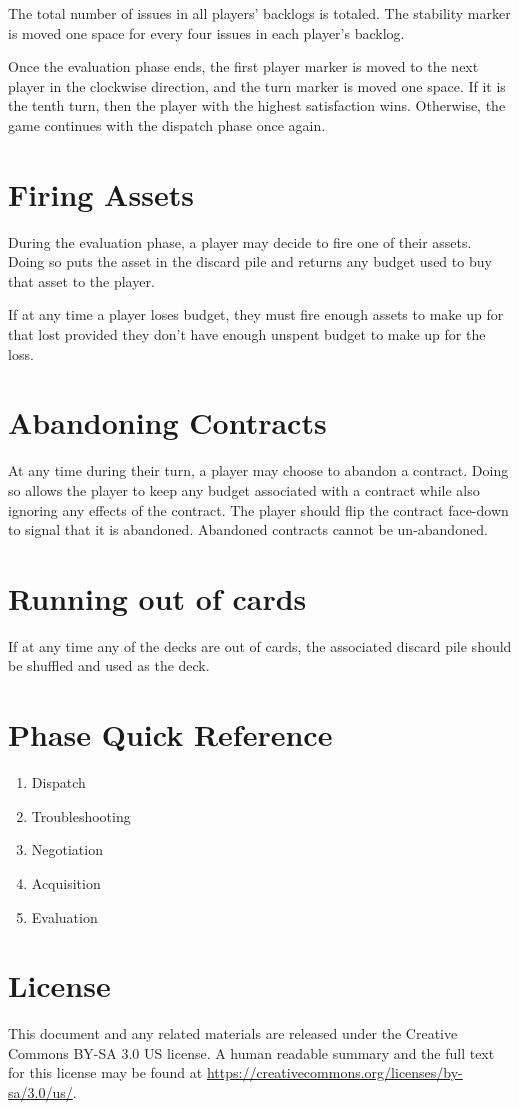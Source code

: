 \documentclass[twocolumn]{article}
\begin{document}
The total number of issues in all players' backlogs is totaled. The stability marker is moved one space for every four issues in each player's backlog.

Once the evaluation phase ends, the first player marker is moved to the next player in the clockwise direction, and the turn marker is moved one space. If it is the tenth turn, then the player with the highest satisfaction wins. Otherwise, the game continues with the dispatch phase once again.

\section*{Firing Assets}

During the evaluation phase, a player may decide to fire one of their assets. Doing so puts the asset in the discard pile and returns any budget used to buy that asset to the player.

If at any time a player loses budget, they must fire enough assets to make up for that lost provided they don't have enough unspent budget to make up for the loss.

\section*{Abandoning Contracts}

At any time during their turn, a player may choose to abandon a contract. Doing so allows the player to keep any budget associated with a contract while also ignoring any effects of the contract. The player should flip the contract face-down to signal that it is abandoned. Abandoned contracts cannot be un-abandoned.

\section*{Running out of cards}

If at any time any of the decks are out of cards, the associated discard pile should be shuffled and used as the deck.

\pagebreak

\section*{Phase Quick Reference}

\begin{enumerate}
	\item Dispatch
	\item Troubleshooting
	\item Negotiation
	\item Acquisition
	\item Evaluation
\end{enumerate}

\section*{License}

This document and any related materials are released under the Creative Commons BY-SA 3.0 US license. A human readable summary and the full text for this license may be found at \url{https://creativecommons.org/licenses/by-sa/3.0/us/}.
\end{document}
